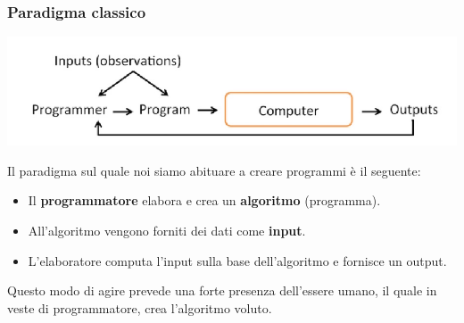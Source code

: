 \subsubsection{Paradigma classico}
\begin{center}
    \includegraphics[scale=0.7]{images/Paradigma_Classico.png}
\end{center}
Il paradigma sul quale noi siamo abituare a creare programmi è
%
il seguente:
\begin{itemize}
    \item Il \textbf{programmatore} elabora e crea un 
%   
    \textbf{algoritmo} (programma).
    \item All'algoritmo vengono forniti dei dati come \textbf{input}.
    \item L'elaboratore computa l'input sulla base dell'algoritmo
%
    e fornisce un output.
\end{itemize}
Questo modo di agire prevede una forte presenza dell'essere umano,
%
il quale in veste di programmatore, crea l'algoritmo voluto. 
